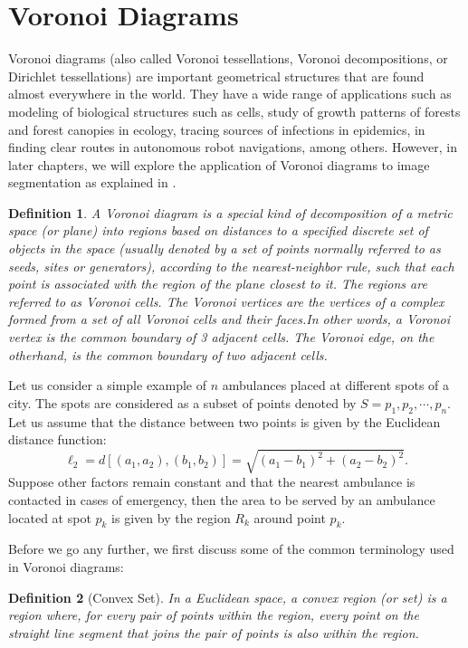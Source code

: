 \documentclass[10pt,a4paper]{article}
\newtheorem{defn}{Definition}
\begin{document}
     \section{Voronoi Diagrams}
     Voronoi diagrams (also called Voronoi tessellations, Voronoi
     decompositions, or Dirichlet tessellations) are important geometrical structures that are found almost everywhere in the world. They have a wide range of applications such as modeling of biological structures such as cells, study of growth patterns of forests and forest canopies in ecology, tracing sources of infections in epidemics, in finding clear routes in autonomous robot navigations, among others. However, in later chapters, we will explore the application of Voronoi diagrams to image segmentation as explained in \citep{stoica2011delaunay}.
     \\
     \begin{defn}
     	A Voronoi diagram is a special kind of decomposition of a metric space (or plane) into regions based on distances to a specified discrete set of objects in the space (usually denoted by a
     	set of points normally referred to as seeds, sites or generators), according to the nearest-neighbor rule, such that each point is associated with the region of the plane closest to it. The regions are referred to as Voronoi cells. The Voronoi vertices are the vertices of a complex formed from a set of all Voronoi cells and their faces.In other words, a Voronoi vertex is the common boundary of 3 adjacent cells. The Voronoi edge, on the otherhand, is the common boundary of two adjacent cells.
     \end{defn}
     Let us consider a simple example of $n$ ambulances placed at different spots of a city. The spots are considered as a subset of points denoted by $S = {p_1, p_2, \cdots, p_n}$. Let us assume that the distance between two points is given by the Euclidean distance function:
      \begin{equation}
      \ell_2 = d[(a_1,a_2),(b_1,b_2)] = \sqrt{(a_1 -b_1)^2 + (a_2 -b_2)^2}.
      \end{equation} Suppose other factors remain constant and that the nearest ambulance is contacted in cases of emergency, then the area to be served by an ambulance located at spot $p_k$ is given by the region $R_k$ around point $p_k$.
      
      Before we go any further, we first discuss some of the common terminology used in Voronoi diagrams:
      \\
      \begin{defn}[Convex Set]
      	In a Euclidean space, a convex region (or set) is a region where, for every pair of points within the region, every point on the straight line segment that joins the pair of points is also within the region.
      \end{defn}
 
\end{document}
